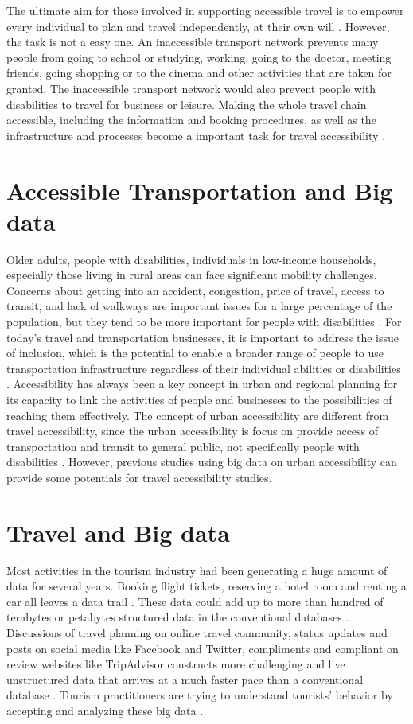 \documentclass[sigconf]{acmart}
\begin{document}
The ultimate aim for those involved in supporting accessible travel is to empower every individual to plan and travel independently, at their own will \cite{zhang2016}. However, the task is not a easy one. An inaccessible transport network prevents many people from going to school or studying, working, going
to the doctor, meeting friends, going shopping or to the
cinema and other activities that are taken for granted. The inaccessible transport network would also prevent people with disabilities to travel for business or leisure. Making the whole travel chain accessible, including the information and booking procedures, as well as the infrastructure and processes become a important task for travel accessibility \cite{Ama}. 



\section{Accessible Transportation and Big data}
Older adults, people with disabilities, individuals in low-income households, especially those living in rural areas can face significant mobility challenges. Concerns about getting into an accident, congestion, price of travel, access to transit, and lack of walkways are important issues for a large percentage of the population, but they tend to be more important for people with disabilities \cite{moya2016dynamic}.
For today's travel and transportation businesses, it is important to address the issue of inclusion, which is the potential to enable a broader range of people to use transportation infrastructure regardless of their individual abilities or disabilities
\cite{milo}.
Accessibility has always been a key concept in urban and regional planning for its capacity to link the activities of people and businesses to the possibilities of reaching them effectively. The concept of urban accessibility are different from travel accessibility, since the urban accessibility is focus on provide access of transportation and transit to general public, not specifically people with disabilities \cite{moya2016dynamic}. However, previous studies using big data on urban accessibility can provide some potentials for travel accessibility studies.

\section{Travel and Big data}
Most activities in the tourism industry had been generating a huge amount of data for
several years. Booking flight tickets, reserving a hotel room and renting a car all
leaves a data trail \cite{Shafiee16}. These data could add up to more than hundred of
terabytes or petabytes structured data in the conventional databases \cite{akerkar2012}.
Discussions of travel planning on online travel community, status updates and posts on
social media like Facebook and Twitter, compliments and compliant on review websites like TripAdvisor
constructs more challenging and live unstructured data that arrives at a much
faster pace than a conventional database \cite{akerkar2012}. Tourism practitioners are
trying to understand tourists' behavior by accepting and analyzing these big data 
\cite{Shafiee16}.
\end{document}
